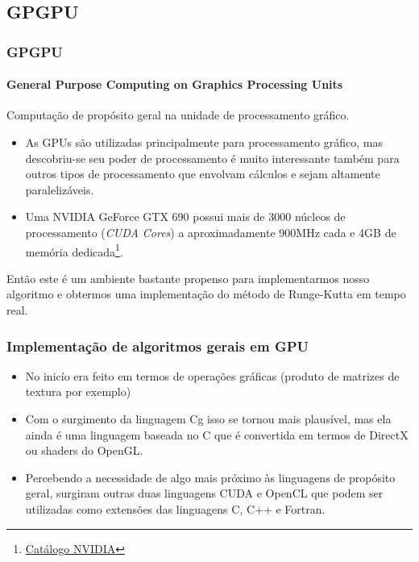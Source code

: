\documentclass[brazil, 10pt]{beamer}
\begin{document}
\subsection{GPGPU}
\begin{frame}
  \frametitle{GPGPU}
  \framesubtitle{General Purpose Computing on Graphics Processing Units}
  
  Computação de propósito geral na unidade de processamento gráfico.
  
  \begin{itemize}
    \item As GPUs são utilizadas principalmente para processamento gráfico, mas descobriu-se seu poder de processamento é muito interessante também para outros tipos de processamento que envolvam cálculos e sejam altamente paralelizáveis.
    \item Uma NVIDIA GeForce GTX 690 possui mais de 3000 núcleos de processamento (\textit{CUDA Cores}) a aproximadamente 900MHz cada e 4GB de memória dedicada\footnote{\href{http://www.nvidia.com.br/object/geforce-gtx-690-br.html}{Catálogo NVIDIA}}.
  \end{itemize}
  
  Então este é um ambiente bastante propenso para implementarmos nosso algoritmo e obtermos uma implementação do método de Runge-Kutta em tempo real.
\end{frame}

\begin{frame}
  \frametitle{Implementação de algoritmos gerais em GPU}
  \begin{itemize}
    \item No inicío era feito em termos de operações gráficas (produto de matrizes de textura por exemplo)
    \item Com o surgimento da linguagem Cg isso se tornou mais plausível, mas ela ainda é uma linguagem baseada no C que é convertida em termos de DirectX ou shaders do OpenGL.
    \item Percebendo a necessidade de algo mais próximo às linguagens de propósito geral, surgiram outras duas linguagens CUDA e OpenCL que podem ser utilizadas como extensões das linguagens C, C++ e Fortran.
  \end{itemize}
\end{frame}
\end{document}
